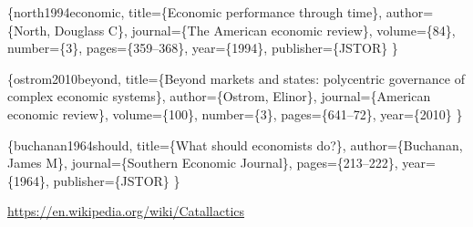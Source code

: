 \documentclass[11pt,]{article}
\begin{document}
\citet{article}\{north1994economic, title=\{Economic performance through
time\}, author=\{North, Douglass C\}, journal=\{The American economic
review\}, volume=\{84\}, number=\{3\}, pages=\{359--368\},
year=\{1994\}, publisher=\{JSTOR\} \}

\citet{article}\{ostrom2010beyond, title=\{Beyond markets and states:
polycentric governance of complex economic systems\}, author=\{Ostrom,
Elinor\}, journal=\{American economic review\}, volume=\{100\},
number=\{3\}, pages=\{641--72\}, year=\{2010\} \}

\citet{article}\{buchanan1964should, title=\{What should economists
do?\}, author=\{Buchanan, James M\}, journal=\{Southern Economic
Journal\}, pages=\{213--222\}, year=\{1964\}, publisher=\{JSTOR\} \}

\url{https://en.wikipedia.org/wiki/Catallactics}

\newpage
\singlespacing 

\end{document}
